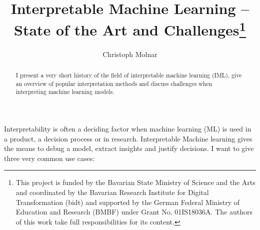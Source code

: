 \documentclass[runningheads]{llncs}
\begin{document}
%
\title{Interpretable Machine Learning -- State of the Art and Challenges\thanks{This project is funded by the Bavarian State Ministry of Science and the Arts and coordinated by the Bavarian Research Institute for Digital Transformation (bidt) and supported by the German Federal Ministry of Education and Research (BMBF) under Grant No. 01IS18036A.
The authors of this work take full responsibilities for its content.
}}
%
%
\author{Christoph Molnar}
%
%
%
\maketitle              %
%
\begin{abstract}
  I present a very short history of the field of interpretable machine learning (IML), give an overview of popular interpretation methods and discuss challenges when interpreting machine learning models.

\end{abstract}
%
%
%
Interpretability is often a deciding factor when machine learning (ML) is used in a product, a decision process or in research.
Interpretable Machine learning gives the means to debug a model, extract insights and justify decisions.
I want to give three very common use cases:

\end{document}
